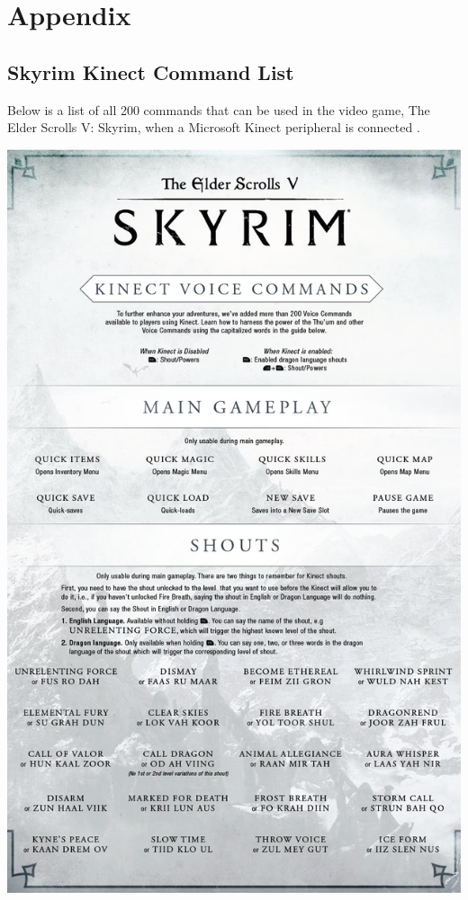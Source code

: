 \documentclass[12pt]{article}
\begin{document}
\newpage
\section{Appendix}
\subsection{Skyrim Kinect Command List}
\label{appendix:skyrim}
Below is a list of all 200 commands that can be used in the video game, The Elder Scrolls V: Skyrim, when a Microsoft Kinect peripheral is connected \cite{RefWorks:24}.

\includegraphics[scale=0.235]{skyrim-1.jpg}
\end{document}
